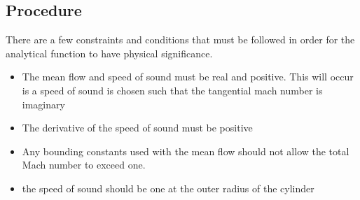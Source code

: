 \documentclass[12pt]{article}
\begin{document}

\subsection{Procedure}

There are a few constraints and conditions that must be followed in order for the analytical 
function to have physical significance.
\begin{itemize}
    \item The mean flow and speed of sound must be real and positive. This will 
        occur is a speed of sound is chosen such that the tangential mach number
        is imaginary
    \item The derivative of the speed of sound must be positive
    \item Any bounding constants used with the mean flow should not allow the 
        total Mach number to exceed one.
    \item the speed of sound should be one at the outer radius of the cylinder
\end{itemize}
\end{document}
